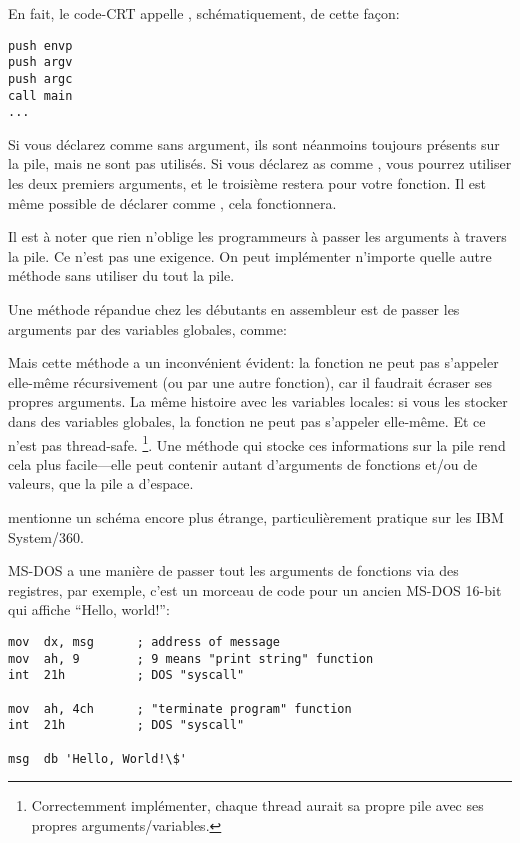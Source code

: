 En fait, le code-\ac{CRT} appelle \main, schématiquement, de cette façon:
	
\begin{lstlisting}[style=customasmx86]
push envp
push argv
push argc
call main
...
\end{lstlisting}

Si vous déclarez \main comme \main sans argument, ils sont néanmoins toujours présents
sur la pile, mais ne sont pas utilisés.
Si vous déclarez \main as comme ,
vous pourrez utiliser les deux premiers arguments, et le troisième restera 
pour votre fonction.
Il est même possible de déclarer \main comme , cela fonctionnera.


Il est à noter que rien n'oblige les programmeurs à passer les arguments à travers
la pile. Ce n'est pas une exigence.
On peut implémenter n'importe quelle autre méthode sans utiliser du tout la pile.

Une méthode répandue chez les débutants en assembleur est de passer les arguments
par des variables globales, comme:



Mais cette méthode a un inconvénient évident: la fonction 
ne peut pas s'appeler elle-même récursivement (ou par une autre fonction),
car il faudrait écraser ses propres arguments.
La même histoire avec les variables locales: si vous les stocker dans des variables
globales, la fonction ne peut pas s'appeler elle-même.
Et ce n'est pas thread-safe.
\footnote{Correctemment implémenter, chaque thread aurait sa propre pile avec ses propres arguments/variables.}.
Une méthode qui stocke ces informations sur la pile rend cela plus facile---elle
peut contenir autant d'arguments de fonctions et/ou de valeurs, que la pile a d'espace.

 mentionne un schéma encore plus étrange, particulièrement
pratique sur les IBM System/360.


MS-DOS a une manière de passer tout les arguments de fonctions via des registres,
par exemple, c'est un morceau de code pour un ancien MS-DOS 16-bit qui affiche
``Hello, world!'':

\begin{lstlisting}[style=customasmx86]
mov  dx, msg      ; address of message
mov  ah, 9        ; 9 means "print string" function
int  21h          ; DOS "syscall"

mov  ah, 4ch      ; "terminate program" function
int  21h          ; DOS "syscall"

msg  db 'Hello, World!\$'
\end{lstlisting}

